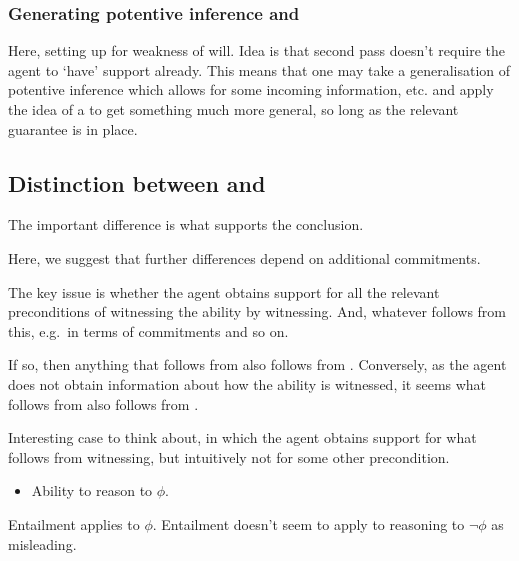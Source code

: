 \subsubsection{Generating potentive inference and \future{}}
\label{sec:generaling-future}

\begin{note}[Idea]
  Here, setting up for weakness of will.
  Idea is that second pass doesn't require the agent to `have' support already.
  This means that one may take a generalisation of potentive inference which allows for some incoming information, etc. and apply the idea of a \future{} to get something much more general, so long as the relevant guarantee is in place.
\end{note}


\subsection{Distinction between \AR{} and \WR{}}
\label{sec:dist-betw-ar}

\begin{note}[Overview]
  The important difference is what supports the conclusion.

  Here, we suggest that further differences depend on additional commitments.
\end{note}


\begin{note}
  The key issue is whether the agent obtains support for all the relevant preconditions of witnessing the ability by witnessing.
  And, whatever follows from this, e.g.\ in terms of commitments and so on.

  If so, then anything that follows from \AR{} also follows from \WR{}.
  Conversely, as the agent does not obtain information about how the ability is witnessed, it seems what follows from \WR{} also follows from \AR{}.
\end{note}

\begin{note}
  Interesting case to think about, in which the agent obtains support for what follows from witnessing, but intuitively not for some other precondition.
  \begin{itemize}
  \item Ability to reason to \(\phi\).
  \end{itemize}
  Entailment applies to \(\phi\).
  Entailment doesn't seem to apply to reasoning to \(\lnot\phi\) as misleading.
\end{note}

